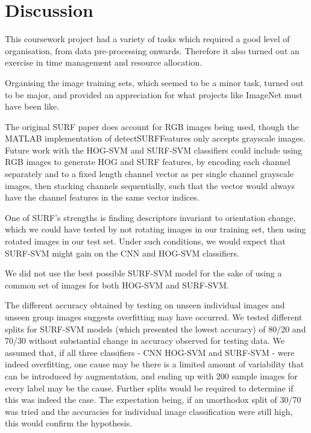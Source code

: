 \section{Discussion}
\label{Discussion-marker}
This coursework project had a variety of tasks which required a good level of organisation, from data pre-processing onwards. Therefore it also turned out an exercise in time management and resource allocation.  

Organising the image training sets, which seemed to be a minor task, turned out to be major, and provided an appreciation for what projects like ImageNet \cite{imagenet_cvpr09} must have been like.  

The original SURF paper \cite{Bay2008346} does account for RGB images being used, though the MATLAB implementation of detectSURFFeatures only accepts grayscale images. Future work with the HOG-SVM and SURF-SVM classifiers could include using RGB images to generate HOG and SURF features, by encoding each channel separately and to a fixed length channel vector as per single channel grayscale images, then stacking channels sequentially, such that the vector would always have the channel features in the same vector indices. 

One of SURF's strengths is finding descriptors invariant to orientation change, which we could have tested by not rotating images in our training set, then using rotated images in our test set. Under such conditions, we would expect that SURF-SVM might gain on the CNN and HOG-SVM classifiers.

We did not use the best possible SURF-SVM model for the sake of using a common set of images for both HOG-SVM and SURF-SVM.

The different accuracy obtained by testing on unseen individual images and unseen group images suggests overfitting may have occurred. We tested different splits for SURF-SVM models (which presented the lowest accuracy) of 80/20 and 70/30 without substantial change in accuracy observed for testing data. We assumed that, if all three classifiers - CNN HOG-SVM and SURF-SVM - were indeed overfitting, one cause may be there is a limited amount of variability that can be introduced by augmentation, and ending up with 200 sample images for every label may be the cause. Further splits would be required to determine if this was indeed the case. The expectation being, if an unorthodox split of 30/70 was tried and the accuracies for individual image classification were still high, this would confirm the hypothesis.  

